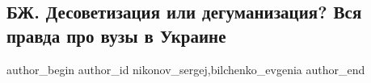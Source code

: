  
 
 
 
 
 
\subsection{БЖ. Десоветизация или дегуманизация? Вся правда про вузы в Украине}
\label{sec:08_09_2021.fb.nikonov_sergej.1.bilchenko_desovetizacia_dehumanizacia}
 
\ifcmt
 author_begin
   author_id nikonov_sergej,bilchenko_evgenia
 author_end
\fi
